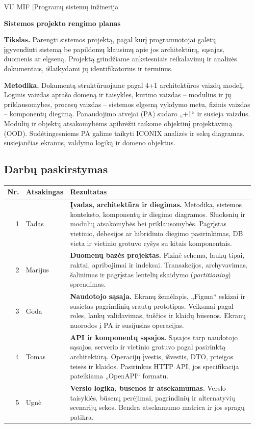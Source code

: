 \documentclass[10pt,a4paper]{article}
\begin{document}
{\small VU MIF \enspace|\enspace Programų sistemų inžinerija\par}
{\LARGE\bfseries Sistemos projekto rengimo planas\par}

\textbf{Tikslas.} Parengti sistemos projektą, pagal kurį programuotojai galėtų
įgyvendinti sistemą be papildomų klausimų apie jos architektūrą, sąsajas,
duomenis ar elgseną. Projektą grindžiame ankstesniais reikalavimų ir analizės
dokumentais, išlaikydami jų identifikatorius ir terminus.

\textbf{Metodika.} Dokumentą struktūruojame pagal 4+1 architektūros vaizdų modelį.
Loginis vaizdas aprašo domeną ir taisykles, kūrimo vaizdas -- modulius ir jų
priklausomybes, procesų vaizdas -- sistemos elgseną vykdymo metu, fizinis
vaizdas -- komponentų diegimą. Panaudojimo atvejai (PA) sudaro „+1“ ir susieja
vaizdus. Modulių ir objektų atsakomybėms apibrėžti taikome objektinį
projektavimą (OOD). Sudėtingesniems PA galime taikyti ICONIX analizės ir
sekų diagramas, susiejančias ekranus, valdymo logiką ir domeno objektus.

\subsection*{Darbų paskirstymas}

\renewcommand{\arraystretch}{1.18}
\begin{tabularx}{\linewidth}{@{}r l >{\raggedright\arraybackslash}X@{}}
\toprule
\textbf{Nr.} & \textbf{Atsakingas} & \textbf{Rezultatas} \\
\midrule
1 & Tadas & \textbf{Įvadas, architektūra ir diegimas.}
Metodika, sistemos konteksto, komponentų ir diegimo diagramos.
Sluoksnių ir modulių atsakomybės bei priklausomybės. Pagrįstas vietinio,
debesijos ar hibridinio diegimo pasirinkimas, DB vieta ir vietinio grotuvo
ryšys su kitais komponentais. \\
2 & Marijus & \textbf{Duomenų bazės projektas.}
Fizinė schema, laukų tipai, raktai, apribojimai ir indeksai.
Transakcijos, archyvavimas, šalinimas ir pagrįstas lentelių skaidymo
(\textit{partitioning}) sprendimas. \\
3 & Goda & \textbf{Naudotojo sąsaja.}
Ekranų žemėlapis, „Figma“ eskizai ir susietas pagrindinių srautų prototipas.
Veiksmai pagal roles, laukų validavimas, tuščios ir klaidų būsenos.
Ekranų nuorodos į PA ir susijusias operacijas. \\
4 & Tomas & \textbf{API ir komponentų sąsajos.}
Sąsajos tarp naudotojo sąsajos, serverio ir vietinio grotuvo pagal
pasirinktą architektūrą. Operacijų įvestis, išvestis, DTO, prieigos teisės
ir klaidos. Pasirinkus HTTP API, jos specifikacija pateikiama „OpenAPI“ formatu. \\
5 & Ugnė & \textbf{Verslo logika, būsenos ir atsekamumas.}
Verslo taisyklės, būsenų perėjimai, pagrindinių ir alternatyvių scenarijų
sekos. Bendra atsekamumo matrica ir jos spragų patikra. \\
\bottomrule
\end{tabularx}
\end{document}
